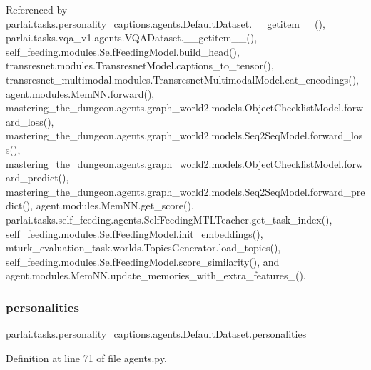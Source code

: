 Referenced by parlai.\+tasks.\+personality\+\_\+captions.\+agents.\+Default\+Dataset.\+\_\+\+\_\+getitem\+\_\+\+\_\+(), parlai.\+tasks.\+vqa\+\_\+v1.\+agents.\+V\+Q\+A\+Dataset.\+\_\+\+\_\+getitem\+\_\+\+\_\+(), self\+\_\+feeding.\+modules.\+Self\+Feeding\+Model.\+build\+\_\+head(), transresnet.\+modules.\+Transresnet\+Model.\+captions\+\_\+to\+\_\+tensor(), transresnet\+\_\+multimodal.\+modules.\+Transresnet\+Multimodal\+Model.\+cat\+\_\+encodings(), agent.\+modules.\+Mem\+N\+N.\+forward(), mastering\+\_\+the\+\_\+dungeon.\+agents.\+graph\+\_\+world2.\+models.\+Object\+Checklist\+Model.\+forward\+\_\+loss(), mastering\+\_\+the\+\_\+dungeon.\+agents.\+graph\+\_\+world2.\+models.\+Seq2\+Seq\+Model.\+forward\+\_\+loss(), mastering\+\_\+the\+\_\+dungeon.\+agents.\+graph\+\_\+world2.\+models.\+Object\+Checklist\+Model.\+forward\+\_\+predict(), mastering\+\_\+the\+\_\+dungeon.\+agents.\+graph\+\_\+world2.\+models.\+Seq2\+Seq\+Model.\+forward\+\_\+predict(), agent.\+modules.\+Mem\+N\+N.\+get\+\_\+score(), parlai.\+tasks.\+self\+\_\+feeding.\+agents.\+Self\+Feeding\+M\+T\+L\+Teacher.\+get\+\_\+task\+\_\+index(), self\+\_\+feeding.\+modules.\+Self\+Feeding\+Model.\+init\+\_\+embeddings(), mturk\+\_\+evaluation\+\_\+task.\+worlds.\+Topics\+Generator.\+load\+\_\+topics(), self\+\_\+feeding.\+modules.\+Self\+Feeding\+Model.\+score\+\_\+similarity(), and agent.\+modules.\+Mem\+N\+N.\+update\+\_\+memories\+\_\+with\+\_\+extra\+\_\+features\+\_\+().

\mbox{\label{classparlai_1_1tasks_1_1personality__captions_1_1agents_1_1DefaultDataset_ab50f9303d20d862328f4961fc20e0428}} 
\subsubsection{\texorpdfstring{personalities}{personalities}}
{\footnotesize\ttfamily parlai.\+tasks.\+personality\+\_\+captions.\+agents.\+Default\+Dataset.\+personalities}



Definition at line 71 of file agents.\+py.

